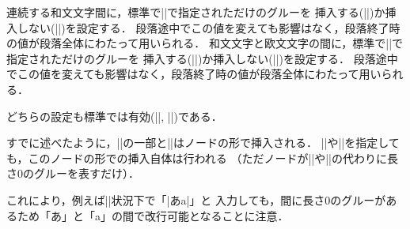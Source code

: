 \documentclass[a4paper,11pt,nomag]{jsarticle}
\begin{document}
\begin{cslist}
  連続する和文文字間に，標準で|\kanjiskip|で指定されただけのグルーを
  挿入する(|\autospacing|)か挿入しない(|\noautospacing|)を設定する．
  段落途中でこの値を変えても影響はなく，段落終了時の値が段落全体にわたって用いられる．
  和文文字と欧文文字の間に，標準で|\xkanjiskip|で指定されただけのグルーを
  挿入する(|\autoxspacing|)か挿入しない(|\noautoxspacing|)を設定する．
  段落途中でこの値を変えても影響はなく，段落終了時の値が段落全体にわたって用いられる．
\end{cslist}

どちらの設定も標準では有効(|\autospacing|, |\autoxspacing|)である．
\begin{dangerous}
  すでに述べたように，|\kanjiskip|の一部と|\xkanjiskip|はノードの形で挿入される．
  |\noautospacing|や|\noautoxspacing|を指定しても，このノードの形での挿入自体は行われる
 （ただノードが|\kanjiskip|や|\xkanjiskip|の代わりに長さ0のグルーを表すだけ）．

  これにより，例えば|\noautoxspacing|状況下で「|あa|」と
  入力しても，間に長さ0のグルーがあるため「あ」と「a」の間で改行可能となることに注意．
\end{dangerous}
\end{document}
